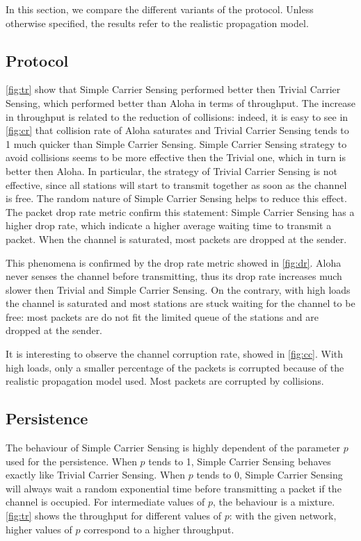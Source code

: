 In this section, we compare the different variants of the protocol.
Unless otherwise specified, the results refer to the realistic propagation model.

\subsection{Protocol}
\cref{fig:tr} show that Simple Carrier Sensing performed better then Trivial Carrier Sensing, which performed better than Aloha in terms of throughput.
The increase in throughput is related to the reduction of collisions: indeed, it is easy to see in \cref{fig:cr}  that collision rate of Aloha saturates and Trivial Carrier Sensing tends to \num{1} much quicker than Simple Carrier Sensing.
Simple Carrier Sensing strategy to avoid collisions seems to be more effective then the Trivial one, which in turn is better then Aloha.
In particular, the strategy of Trivial Carrier Sensing is not effective, since all stations will start to transmit together as soon as the channel is free.
The random nature of Simple Carrier Sensing helps to reduce this effect.
The packet drop rate metric confirm this statement: Simple Carrier Sensing has a higher drop rate, which indicate a higher average waiting time to transmit a packet.
When the channel is saturated, most packets are dropped at the sender.


This phenomena is confirmed by the drop rate metric showed in \cref{fig:dr}.
Aloha never senses the channel before transmitting, thus its drop rate increases much slower then Trivial and Simple Carrier Sensing.
On the contrary, with high loads the channel is saturated and most stations are stuck waiting for the channel to be free: most packets are do not fit the limited queue of the stations and are dropped at the sender.

It is interesting to observe the channel corruption rate, showed in \cref{fig:cc}.
With high loads, only a smaller percentage of the packets is corrupted because of the realistic propagation model used.
Most packets are corrupted by collisions.


\subsection{Persistence}
The behaviour of Simple Carrier Sensing is highly dependent of the parameter $p$ used for the persistence.
When $p$ tends to \num{1}, Simple Carrier Sensing behaves exactly like Trivial Carrier Sensing.
When $p$ tends to \num{0}, Simple Carrier Sensing will always wait a random exponential time before transmitting a packet if the channel is occupied.
For intermediate values of $p$, the behaviour is a mixture.
\cref{fig:tr} shows the throughput for different values of $p$: with the given network, higher values of $p$ correspond to a higher throughput.



